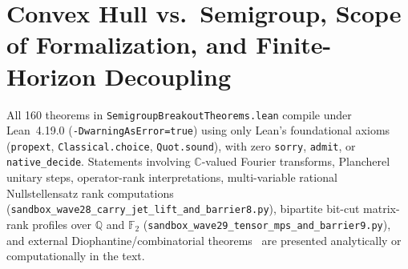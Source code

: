 \documentclass[11pt]{article}
\begin{document}
\begin{abstract}
Guided by the \textbf{Post-Bit-Length Exhaustion Principle} ($u_K \ge 1$ and $P_0 < 2^{T_K}$), we formalize \textbf{160 \texttt{sorry}-free, warning-free theorems (\texttt{SB.1}--\texttt{SB.160})} in \nolinkurl{SemigroupBreakoutTheorems.lean} (\texttt{SB.1}--\texttt{SB.152}, \texttt{SB.156}--\texttt{SB.158}, and Parts~1--3 of \texttt{SB.159} over $\mathbb{N}/\mathbb{Z}$, Parts~1--2 of \texttt{SB.160} polymorphically over any commutative ring $R$ with Part~3 over $\mathbb{Z}$, and \texttt{SB.153}--\texttt{SB.155} plus Part~4 of \texttt{SB.159} and Part~4 of \texttt{SB.160} over $\mathbb{R}$; complex character sums $\mathcal{S}(h;N) \in \mathbb{C}$ and external transcendence bounds are treated analytically). Principal contributions include: (1) formalization of Flatto's (1992)~\cite{Flatto1992} and Flatto--Lagarias--Pollington's (1995)~\cite{FLP1995} effective bound $\#(Z \cap [0, X)) \le |\mathcal{C}_W| \le 3(3/2)^W - 2$ ($X \le 2^W$, $O(X^{\log_2(3/2)}) \approx O(X^{0.58496})$) directly over $\mathbb{R}$ (\texttt{SB.112}, \texttt{SB.153}), the exact Parry kneading spine renewal identity on $|\mathcal{C}_N|$ (\texttt{SB.141}, supporting $O(N^2)$ dynamic programming out to $N = 300$), and exact $(N+1)$ scaled-width cardinality (\texttt{SB.149}); (2) the Ceiling-Dual Gauge $W_r = (5 P_r + 4)/36$ (\texttt{SB.81}), Two-Superblock Catalan--Pillai reduction (\texttt{SB.115}), and unconditional real-companion $159/160$ ($99.375\%$) mod-$320$ even-gauge pinch (\texttt{SB.138}--\texttt{SB.139}, \texttt{SB.154}); (3) Kempner Threshold Inversion proving $3/2$ is uniquely over-determined among odd fractions $q/2$ (\texttt{SB.105}--\texttt{SB.108}); and (4) 2D binary-carry full-adder jet linearization, bipartite bit-cut MPS arch bounds, and Barriers~\#8 and~\#9, extending the map to nine structural barriers guarding $Z = \emptyset$ (\texttt{SB.155}--\texttt{SB.160}).
\end{abstract}

\section{Convex Hull vs.\ Semigroup, Scope of Formalization, and Finite-Horizon Decoupling}

All 160 theorems in \nolinkurl{SemigroupBreakoutTheorems.lean} compile under Lean~4.19.0 (\texttt{-DwarningAsError=true}) using only Lean's foundational axioms (\texttt{propext}, \texttt{Classical.choice}, \texttt{Quot.sound}), with zero \texttt{sorry}, \texttt{admit}, or \texttt{native\_decide}. Statements involving $\mathbb{C}$-valued Fourier transforms, Plancherel unitary steps, operator-rank interpretations, multi-variable rational Nullstellensatz rank computations (\nolinkurl{sandbox_wave28_carry_jet_lift_and_barrier8.py}), bipartite bit-cut matrix-rank profiles over $\mathbb{Q}$ and $\mathbb{F}_2$ (\nolinkurl{sandbox_wave29_tensor_mps_and_barrier9.py}), and external Diophantine/combinatorial theorems~\cite{Ridout1957,Polya1921,Schlickewei1990,Matveev2000,ErdosRado1960,Strassen1987,NaslundSawin2017} are presented analytically or computationally in the text.
\end{document}
